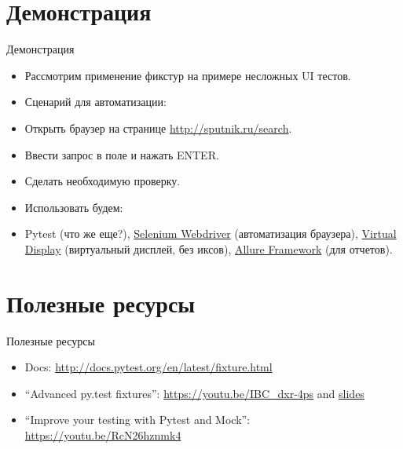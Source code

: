 \documentclass{beamer}
\begin{document}
\section{Демонстрация}
\begin{frame}[fragile]{Демонстрация}
	\begin{itemize}
	\item Рассмотрим применение фикстур на примере несложных UI тестов.
	\pause \item Сценарий для автоматизации:
	\pause \item Открыть браузер на странице \url{http://sputnik.ru/search}.
	\pause \item Ввести запрос в поле и нажать ENTER.
	\pause \item Сделать необходимую проверку.
	\pause \item Использовать будем:
	\pause \item Pytest (что же еще?),
		\href{http://selenium-python.readthedocs.io/}{Selenium Webdriver} (автоматизация браузера),
		\href{https://github.com/ponty/pyvirtualdisplay}{Virtual Display} (виртуальный дисплей, без иксов),
		\href{http://allure.qatools.ru/}{Allure Framework} (для отчетов).
	\end{itemize}
\end{frame}

\section{Полезные ресурсы}
\begin{frame}[fragile]{Полезные ресурсы}
	\begin{itemize}
	\item Docs: \url{http://docs.pytest.org/en/latest/fixture.html}
	\item ``Advanced py.test fixtures'':
		\url{https://youtu.be/IBC_dxr-4ps} and
		\href{http://devork.be/talks/advanced-fixtures/advfix.html}{slides}
	\item ``Improve your testing with Pytest and Mock'':
		\url{https://youtu.be/RcN26hznmk4}
	\end{itemize}
\end{frame}
\end{document}
